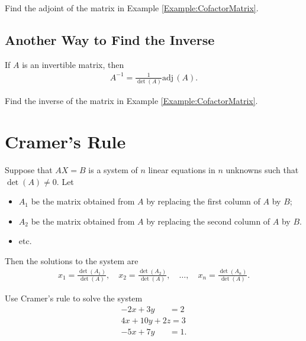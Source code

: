 \documentclass[12pt,a4paper]{article}
\newcounter{example}[section]
\begin{document}
	\begin{example}
	Find the adjoint of the matrix in Example \ref{Example:CofactorMatrix}.
	\end{example}
	
	\vfill
	
	\subsection{Another Way to Find the Inverse}
	If $A$ is an invertible matrix, then	
		\begin{align*}
		A^{-1} = \frac{1}{\det (A)} \mathrm{adj} \, (A) .
		\end{align*}
	
	\begin{example}
	Find the inverse of the matrix in Example \ref{Example:CofactorMatrix}.
	\end{example}
	
	\vfill
	
\newpage

\section{Cramer's Rule}
	
	Suppose that $AX = B$ is a system of $n$ linear equations in $n$ unknowns such that $\det (A) \neq 0$. Let 
		\begin{itemize}
		\item $A_1$ be the matrix obtained from $A$ by replacing the first column of $A$ by $B$;
		\item $A_2$ be the matrix obtained from $A$ by replacing the second column of $A$ by $B$.
		\item etc.
		\end{itemize}
	Then the solutions to the system are
		\begin{align*}
		x_1 = \frac{\det (A_1)}{\det (A)} , \quad x_2 = \frac{\det (A_2)}{\det (A)} , \quad \ldots , \quad x_n = \frac{\det (A_n)}{\det (A)} .
		\end{align*}

	
	\begin{example}
	Use Cramer's rule to solve the system
		\begin{align*}
		-2x + 3y \phantom{+ 2z} = 2 \\
		4x + 10y + 2z = 3 \\
		-5x + 7y \phantom{+ 2z} = 1 .
		\end{align*}
	\end{example}
\end{document}
